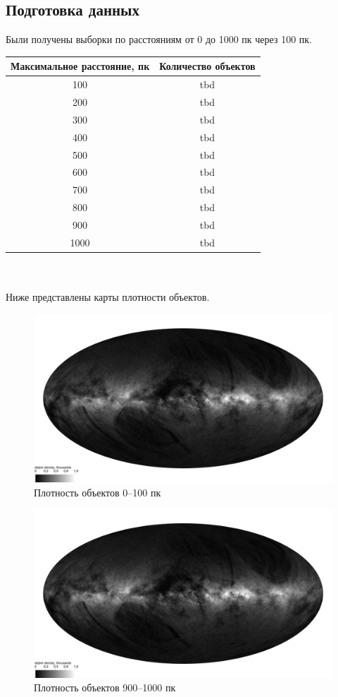 \documentclass[14pt]{article} %
\begin{document}
\subsection{Подготовка данных}
Были получены выборки по расстояниям от 0 до 1000 пк через 100 пк.
\begin{tabular}{|c|c|}
\hline
Максимальное расстояние, пк&Количество объектов\\
\hline
100& tbd\\
200& tbd\\
300& tbd\\
400& tbd\\
500& tbd\\
600& tbd\\
700& tbd\\
800& tbd\\
900& tbd\\
1000& tbd\\
\hline
\end{tabular}\\\\
Ниже представлены карты плотности объектов.\\
\begin{figure}[h!]
\includegraphics[draft,width=1\linewidth]{healpdens100.jpg}
\caption*{Плотность объектов 0--100 пк}
\end{figure}
\begin{figure}[h!]
\includegraphics[draft,width=1\linewidth]{healpdens900.jpg}
\caption*{Плотность объектов 900--1000 пк}
\end{figure}
\end{document}
